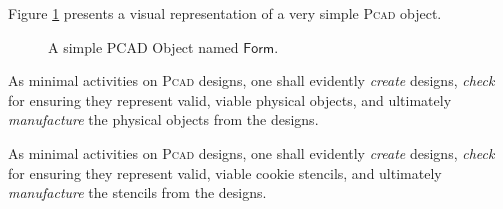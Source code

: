 \begin{olddef}
\begin{Example}[PCAD]

   Figure \ref{fig:PCAD-Visual} presents a visual representation of a very 
simple \textsc{Pcad} object. 
\begin{figure}[t]
   \centering
   \caption{A simple PCAD Object named $\mathsf{Form}$.}%
   \label{fig:PCAD-Visual}%
\end{figure}
\end{Example}

As minimal activities on \textsc{Pcad} designs, one shall evidently 
\emph{create} designs, \emph{check} for ensuring they represent valid, viable 
physical objects, and ultimately \emph{manufacture} the physical objects from 
the designs.
\end{olddef}

\begin{newdef}
As minimal activities on \textsc{Pcad} designs, one shall evidently 
\emph{create} designs, \emph{check} for ensuring they represent valid, viable 
cookie stencils, and ultimately \emph{manufacture} the stencils from 
the designs.
\end{newdef}


% 
% 
% 
% 
% 
% 
% 


